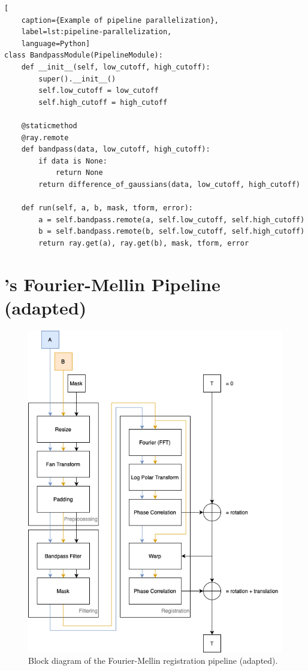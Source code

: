 \begin{lstlisting}[
    caption={Example of pipeline parallelization},
    label=lst:pipeline-parallelization,
    language=Python]
class BandpassModule(PipelineModule):
    def __init__(self, low_cutoff, high_cutoff):
        super().__init__()
        self.low_cutoff = low_cutoff
        self.high_cutoff = high_cutoff

    @staticmethod
    @ray.remote
    def bandpass(data, low_cutoff, high_cutoff):
        if data is None:
            return None
        return difference_of_gaussians(data, low_cutoff, high_cutoff)

    def run(self, a, b, mask, tform, error):
        a = self.bandpass.remote(a, self.low_cutoff, self.high_cutoff)
        b = self.bandpass.remote(b, self.low_cutoff, self.high_cutoff)
        return ray.get(a), ray.get(b), mask, tform, error
\end{lstlisting}

\section{\citeauthor{Reddy1996}'s Fourier-Mellin Pipeline (adapted) \cite{Reddy1996}}
\label{sec:fmpipeline}
\begin{figure}[H] 
  \centering
  \includegraphics[width=.7\textwidth]{figures/fourier_mellin_pipeline.png}
  \caption{Block diagram of the Fourier-Mellin registration pipeline (adapted).}
  \label{fig:fmpipeline}
\end{figure}

